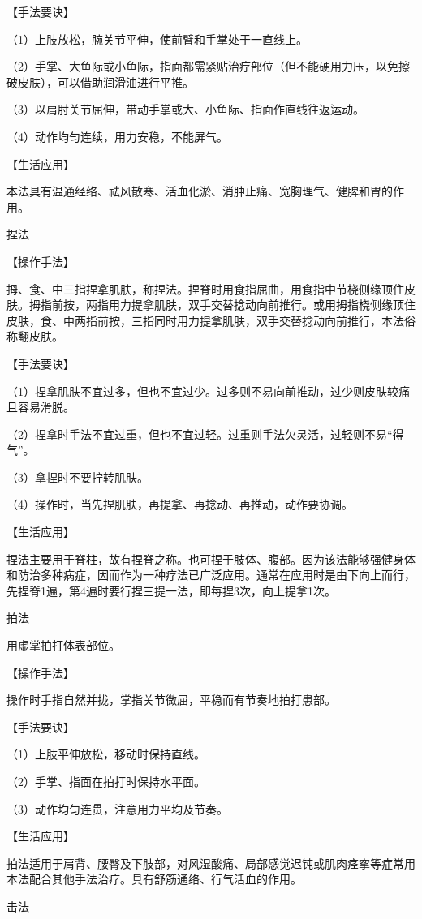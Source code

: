 \documentclass[12pt,UTF8]{ctexbook}
\begin{document}
【手法要诀】

（1）上肢放松，腕关节平伸，使前臂和手掌处于一直线上。

（2）手掌、大鱼际或小鱼际，指面都需紧贴治疗部位（但不能硬用力压，以免擦破皮肤），可以借助润滑油进行平推。

（3）以肩肘关节屈伸，带动手掌或大、小鱼际、指面作直线往返运动。

（4）动作均匀连续，用力安稳，不能屏气。

【生活应用】

本法具有温通经络、祛风散寒、活血化淤、消肿止痛、宽胸理气、健脾和胃的作用。

捏法

【操作手法】

拇、食、中三指捏拿肌肤，称捏法。捏脊时用食指屈曲，用食指中节桡侧缘顶住皮肤。拇指前按，两指用力提拿肌肤，双手交替捻动向前推行。或用拇指桡侧缘顶住皮肤，食、中两指前按，三指同时用力提拿肌肤，双手交替捻动向前推行，本法俗称翻皮肤。

【手法要诀】

（1）捏拿肌肤不宜过多，但也不宜过少。过多则不易向前推动，过少则皮肤较痛且容易滑脱。

（2）捏拿时手法不宜过重，但也不宜过轻。过重则手法欠灵活，过轻则不易“得气”。

（3）拿捏时不要拧转肌肤。

（4）操作时，当先捏肌肤，再提拿、再捻动、再推动，动作要协调。

【生活应用】

捏法主要用于脊柱，故有捏脊之称。也可捏于肢体、腹部。因为该法能够强健身体和防治多种病症，因而作为一种疗法已广泛应用。通常在应用时是由下向上而行，先捏脊1遍，第4遍时要行捏三提一法，即每捏3次，向上提拿1次。

拍法

用虚掌拍打体表部位。

【操作手法】

操作时手指自然并拢，掌指关节微屈，平稳而有节奏地拍打患部。

【手法要诀】

（1）上肢平伸放松，移动时保持直线。

（2）手掌、指面在拍打时保持水平面。

（3）动作均匀连贯，注意用力平均及节奏。

【生活应用】

拍法适用于肩背、腰臀及下肢部，对风湿酸痛、局部感觉迟钝或肌肉痉挛等症常用本法配合其他手法治疗。具有舒筋通络、行气活血的作用。

击法
\end{document}
